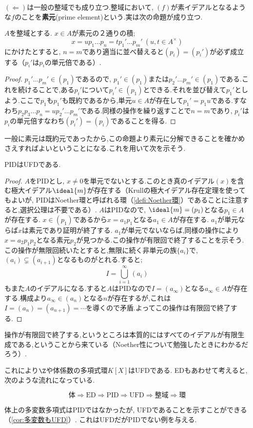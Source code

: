 $(\Longleftarrow)$は一般の整域でも成り立つ.整域において, $(f)$が素イデアルとなるような$f$のことを\textbf{素元}(prime element)という.実は次の命題が成り立つ.

\begin{prop}
	$A$を整域とする. $x\in A$が素元の２通りの積;
	\[x=up_1\dots p_n=tp_1'\dots p_m'~(u,t\in A^\times)\]
	にかけたとすると, $n=m$であり適当に並べ替えると$(p_i)=(p_i')$が必ず成立する（$p_i'$は$p_i$の単元倍である）.
\end{prop}

\begin{proof}
	$p_1'\dots p_m'\in (p_1)$であるので, $p_1'\in (p_1)$または$p_2'\dots p_m'\in (p_1)$である.これを続けることで,ある$p_i'$について$p_i'\in (p_1)$とできる.それを並び替えて$p_1'$としよう.ここで$p_1$も$p_1'$も既約であるから,単元$u\in A$が存在して$p_1'=p_1u$である.すなわち$p_2p_3\dots p_n=up_2'\dots p_m'$である.同様の操作を繰り返すことで$n=m$であり, $p_i'$は$p_i$の単元倍すなわち$(p_i')=(p_i)$であることを得る.
\end{proof}

一般に素元は既約元であったから,この命題より素元に分解できることを確かめさえすればよいということになる.これを用いて次を示そう.
\begin{thm}
	PIDはUFDである.
\end{thm}

\begin{proof}
	$A$をPIDとし, $x\neq0$を単元でないとする.このとき真のイデアル$(x)$を含む極大イデアル$\ideal{m}$が存在する（Krullの極大イデアル存在定理を使ってもよいが, PIDはNoether環と呼ばれる環（\ref{defi:Noether環}）であることに注意すると,選択公理は不要である）. $A$はPIDなので, $\ideal{m}=(p_1)$となる$p_1\in A$が存在する. $x\in(p_1)$であるから$x=a_1p_1$となる$a_1\in A$が存在する. $a_1$が単元ならば$x$は素元であり証明が終了する. $a_1$が単元でないならば,同様の操作により$x=a_2p_1p_2$となる素元$p_2$が見つかる.この操作が有限回で終了することを示そう.この操作が無限回続いたとすると,無限に続く非単元の族$\{a_i\}$で, $(a_i)\subsetneq (a_{i+1})$となるものがとれる.すると;
	\[I=\bigcup_{i=1}^\infty (a_i)\]
	もまた$A$のイデアルになる.すると$A$はPIDなので$I=(a_\infty)$となる$a_\infty\in A$が存在する.構成より$a_\infty\in (a_n)$となる$n$が存在するが,これは$I=(a_n)=(a_{n+1})=\cdots$を導くので矛盾.よってこの操作は有限回で終了する.
\end{proof}

操作が有限回で終了する,というところは本質的にはすべてのイデアルが有限生成である,ということから来ている（Noether性について勉強したときにわかるだろう）.

これにより$\Z$や体係数の多項式環$K[X]$はUFDである. EDもあわせて考えると,次のような流れになっている.

\[\text{体}\Longrightarrow\text{ED}\Longrightarrow\text{PID}\Longrightarrow\text{UFD}\Longrightarrow\text{整域}\Longrightarrow\text{環}\]

体上の多変数多項式はPIDではなかったが, UFDであることを示すことができる（\ref{cor:多変数もUFD}）. これはUFDだがPIDでない例を与える.


